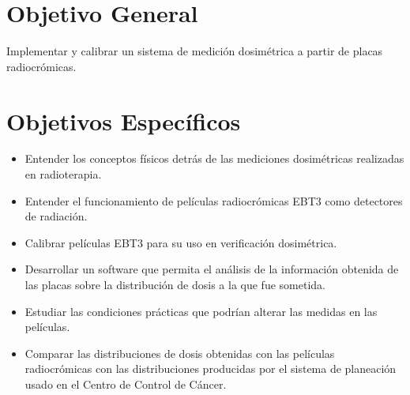 \section{Objetivo General}


Implementar y calibrar un sistema de medición dosimétrica a partir de placas radiocrómicas.

\section{Objetivos Específicos}


\begin{itemize}
	\item Entender los conceptos físicos detrás de las mediciones dosimétricas realizadas en radioterapia.
	\item Entender el funcionamiento de películas radiocrómicas EBT3 como detectores de radiación.
	\item Calibrar películas EBT3 para su uso en verificación dosimétrica.
	\item Desarrollar un software que permita el análisis de la información obtenida de las placas sobre la distribución de dosis a la que fue sometida.
	\item Estudiar las condiciones prácticas que podrían alterar las medidas en las películas. 
	\item Comparar  las  distribuciones  de  dosis  obtenidas  con  las  películas  radiocrómicas con las distribuciones producidas por el sistema de planeación usado en el Centro de Control de Cáncer.
	
\end{itemize}
